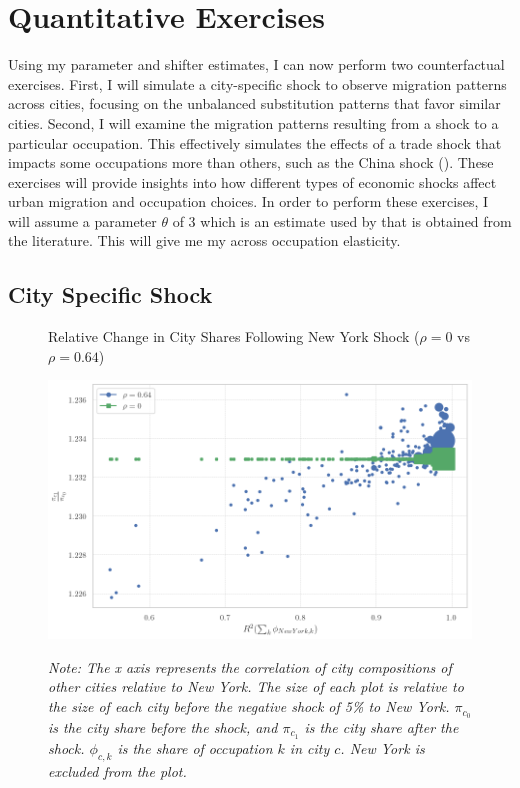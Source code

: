 \documentclass[10pt]{article}
\begin{document}
\section{Quantitative Exercises}

Using my parameter and shifter estimates, I can now perform two counterfactual exercises. First, I will simulate a city-specific shock to observe migration patterns across cities, focusing on the unbalanced substitution patterns that favor similar cities. Second, I will examine the migration patterns resulting from a shock to a particular occupation. This effectively simulates the effects of a trade shock that impacts some occupations more than others, such as the China shock (\cite{adh2013}). These exercises will provide insights into how different types of economic shocks affect urban migration and occupation choices. In order to perform these exercises, I will assume a parameter $\theta$ of 3 which is an estimate used by \cite{redding} that is obtained from the literature. This will give me my across occupation elasticity.

\subsection{City Specific Shock}

\begin{figure}[!htb]
    \centering
    \caption{Relative Change in City Shares Following New York Shock ($\rho = 0$ vs $\rho = 0.64$)}
    \includegraphics[width=\textwidth]{../../estimations/graphs/city_shock.png}
    \label{ny_change_graph}
    \caption*{\small\textit{Note: The x axis represents the correlation of city compositions of other cities relative to New York. The size of each plot is relative to the size of each city before the negative shock of 5\% to New York. $\pi_{c_0}$ is the city share before the shock, and $\pi_{c_1}$ is the city share after the shock. $\phi_{c, k}$ is the share of occupation $k$ in city $c$. New York is excluded from the plot.}}
\end{figure}
\end{document}
